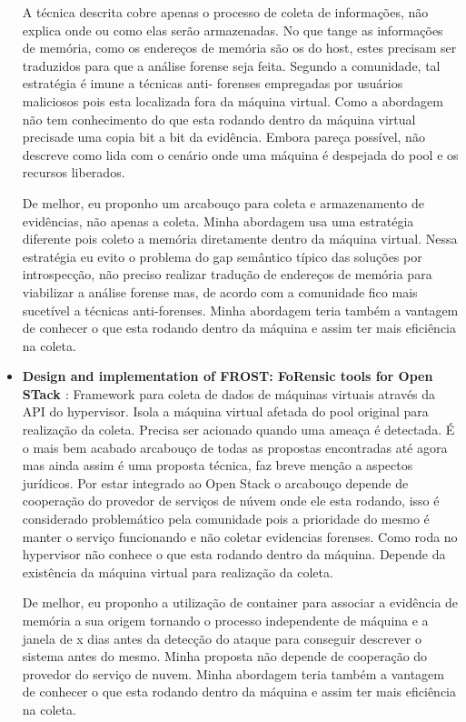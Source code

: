 \documentclass[
	12pt,				%
	openright,			%
	oneside,			%
	a4paper,			%
	english,			%
	french,				%
	spanish,			%
	brazil,				%
	]{abntex2}
\begin{document}
\begin{itemize}
A técnica descrita cobre apenas o processo de coleta de informações, não explica onde ou como elas serão armazenadas. No que tange as informações de memória, como os 
endereços de memória são os do host, estes precisam ser traduzidos para que a análise forense seja feita. Segundo a comunidade, tal estratégia é imune a técnicas anti-
forenses empregadas por usuários maliciosos pois esta localizada fora da máquina virtual. Como a abordagem não tem conhecimento do que esta rodando dentro da máquina 
virtual precisade uma copia bit a bit da evidência. Embora pareça possível, não descreve como lida com o cenário onde uma máquina é despejada do pool e os recursos liberados. 

De melhor, eu proponho um arcabouço para coleta e armazenamento de evidências, não apenas a coleta. Minha abordagem usa uma estratégia diferente pois coleto a memória diretamente
dentro da máquina virtual. Nessa estratégia eu evito o problema do gap semântico típico das soluções por introspecção, não preciso realizar tradução de endereços de memória 
para viabilizar a análise forense mas, de acordo com a comunidade fico mais sucetível a técnicas anti-forenses. Minha abordagem teria também a vantagem de conhecer o que esta 
rodando dentro da máquina e assim ter mais eficiência na coleta.\\

\item \textbf{Design and implementation of FROST: FoRensic tools for Open STack \cite{Dykstra2013} }: Framework para coleta de dados de máquinas virtuais através da API do
hypervisor. Isola a máquina virtual afetada do pool original para realização da coleta. Precisa ser acionado quando uma ameaça é detectada. É o mais bem acabado arcabouço de
todas as propostas encontradas até agora mas ainda assim é uma proposta técnica, faz breve menção a aspectos jurídicos. Por estar integrado ao Open Stack o arcabouço depende de
cooperação do provedor de serviços de núvem onde ele esta rodando, isso é considerado problemático pela comunidade pois a prioridade do mesmo é manter o serviço funcionando
e não coletar evidencias forenses. Como roda no hypervisor não conhece o que esta rodando dentro da máquina. Depende da existência da máquina virtual para realização da coleta.

De melhor, eu proponho a utilização de container para associar a evidência de memória a sua origem tornando o processo independente de máquina e a janela de x dias antes da 
detecção do ataque para conseguir descrever o sistema antes do mesmo. Minha proposta não depende de cooperação do provedor do serviço de nuvem. Minha abordagem teria também
a vantagem de conhecer o que esta rodando dentro da máquina e assim ter mais eficiência na coleta.\\
  

\end{itemize}
\end{document}
